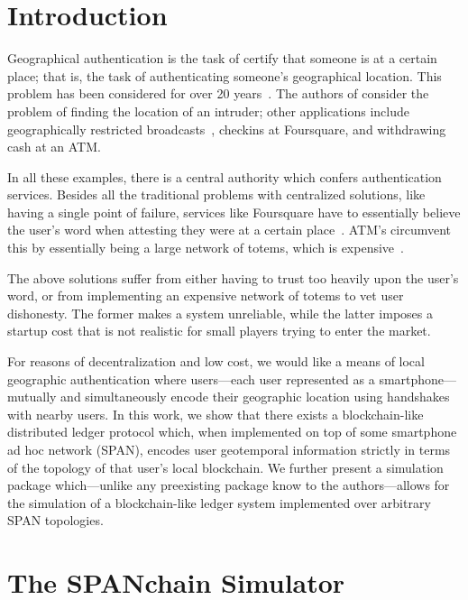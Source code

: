 \section{Introduction}

Geographical authentication
is the task of certify that someone is at a certain place;
that is,
the task of authenticating someone's geographical location.
This problem has been considered for over 20 years~\cite{denning_1996}.
The authors of \cite{denning_1996} consider the problem of finding
the location of an intruder;
other applications include geographically restricted broadcasts~\cite{gdpr},
checkins at Foursquare,
and withdrawing cash at an ATM.

In all these examples,
there is a central authority which confers authentication services.
Besides all the traditional problems with centralized solutions,
like having a single point of failure,
services like Foursquare have to essentially believe the user's word
when attesting they were at a certain place~\cite{glas2015breaking}.
ATM's circumvent this by essentially being a large network of totems,
which is expensive~\cite{totem_patent}.

The above solutions suffer from either having to trust too heavily upon
the user's word, or from implementing an expensive network of totems to
vet user dishonesty. The former makes a system unreliable, while the latter
imposes a startup cost that is not realistic for small players trying to enter
the market.

For reasons of decentralization and low cost, we would like a
means of local geographic authentication where users---each user represented as
a smartphone---mutually and simultaneously encode their geographic location using
handshakes with nearby users. In this work, we show that there exists a
blockchain-like distributed ledger protocol which, when implemented on top of some
smartphone ad hoc network (SPAN), encodes user geotemporal information strictly in
terms of the topology of that user's local blockchain. We further present a simulation
package which---unlike any preexisting package know to the authors---allows for the
simulation of a blockchain-like ledger system implemented over arbitrary SPAN
topologies.

\section{The SPANchain Simulator}
\label{sec:SPANchain}

